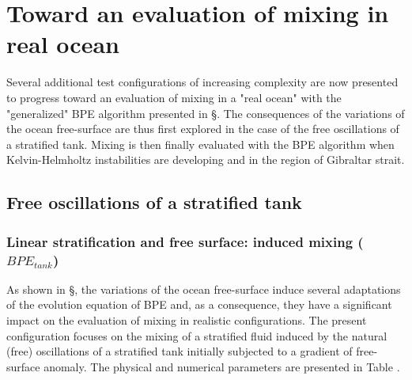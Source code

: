 \section{Toward an evaluation of mixing in real ocean}
\label{section_CROCO_BPE}
Several additional test configurations of increasing complexity are now presented to progress toward an evaluation of mixing in a "real ocean" with the "generalized" BPE algorithm presented in \S {}. The consequences of the variations of the ocean free-surface are thus first explored in the case of the free oscillations of a stratified tank. Mixing is then finally evaluated with the BPE algorithm when Kelvin-Helmholtz instabilities are developing and in the region of Gibraltar strait.

\subsection{Free oscillations of a stratified tank}
\subsubsection{Linear stratification and free surface: induced mixing ($BPE_{tank}$)}

As shown in \S {}, the variations of the ocean free-surface induce several adaptations of the evolution equation of BPE and, as a consequence, they have a significant impact on the evaluation of mixing in realistic configurations. The present configuration focuses on the mixing of a stratified fluid induced by the natural (free) oscillations of a stratified tank initially subjected to a gradient of free-surface anomaly. The physical and numerical parameters are presented in Table .

